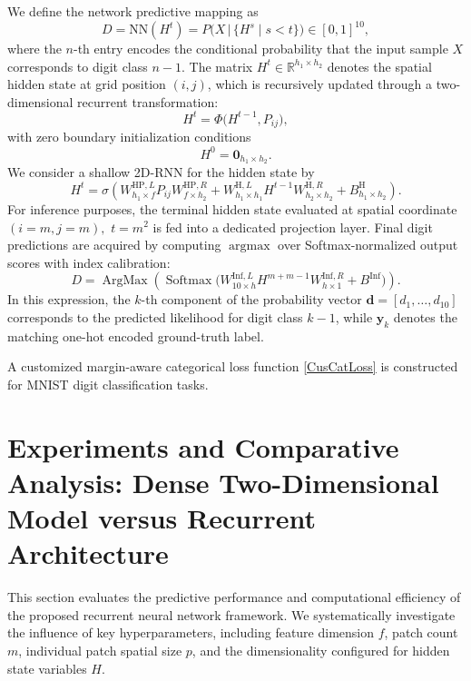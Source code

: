 \documentclass[pdflatex,sn-mathphys-num]{sn-jnl}%
\theoremstyle{thmstyleone}%
\theoremstyle{thmstyletwo}%
\theoremstyle{thmstylethree}%
\begin{document}
We define the network predictive mapping as
\[
D=\mathrm{NN}(H^{t}) = P\big(X \,\big|\, \{H^{s}\mid s<t\}\big) \in [0,1]^{10},
\]
where the $n$-th entry encodes the conditional probability that the input sample $X$ corresponds to digit class $n-1$. The matrix $H^{t}\in\mathbb{R}^{h_1\times h_2}$ denotes the spatial hidden state at grid position $(i,j)$, which is recursively updated through a two-dimensional recurrent transformation:
\begin{equation}
H^{t}=\Phi\big(H^{t-1}, P_{ij}\big),
\end{equation}
with zero boundary initialization conditions
\[
H^{0} = \boldsymbol{0}_{h_1\times h_2}.
\]
We consider a shallow 2D-RNN  for the hidden state by
\begin{equation}
H^{t}=\sigma\left(W^{\text{HP},L}_{h_1\times f} P_{ij} W^{\text{HP},R}_{f\times h_2}
+ W^{\text{H},L}_{h_1\times h_1} H^{t-1} W^{\text{H},R}_{h_2\times h_2}
+ B^{\text{H}}_{h_1\times h_2}\right).
\end{equation}
For inference purposes, the terminal hidden state evaluated at spatial coordinate $(i=m,j=m),$  $t=m^2$ is fed into a dedicated projection layer. Final digit predictions are acquired by computing $\operatorname{argmax}$ over Softmax-normalized output scores with index calibration:
\[
D= \operatorname{ArgMax}\left(\operatorname{Softmax}\big(W^{\text{Inf},L}_{10\times h} H^{m+m-1} W^{\text{Inf},R}_{h\times 1} + B^{\text{Inf}}\big)\right).
\]
In this expression, the $k$-th component of the probability vector $\boldsymbol{d}=[d_1,\dots,d_{10}]$ corresponds to the predicted likelihood for digit class $k-1$, while $\boldsymbol{y}_k$ denotes the matching one-hot encoded ground-truth label.

A customized margin-aware categorical loss function \eqref{CusCatLoss} is constructed for MNIST digit classification tasks.

\section{Experiments and Comparative Analysis: Dense Two-Dimensional Model versus Recurrent Architecture}\label{Experiments and Comparative Analysis}
This section evaluates the predictive performance and computational efficiency of the proposed recurrent neural network framework. We systematically investigate the influence of key hyperparameters, including feature dimension $f$, patch count $m$, individual patch spatial size $p$, and the dimensionality configured for hidden state variables $H$.
\end{document}
